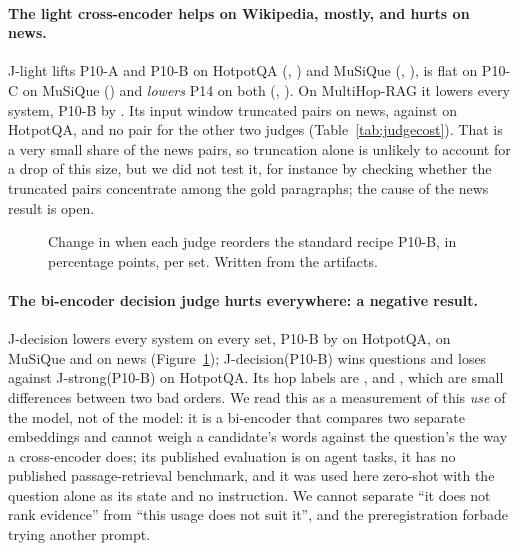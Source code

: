 \paragraph{The light cross-encoder helps on Wikipedia, mostly, and hurts on news.} J-light
lifts P10-A and P10-B on HotpotQA (\deltaLightPTenAHotpot\pp, \deltaLightPTenBHotpot\pp) and MuSiQue
(\deltaLightPTenAMusique\pp, \deltaLightPTenBMusique\pp), is flat on P10-C on MuSiQue
(\deltaLightPTenCMusique\pp) and \emph{lowers} P14 on both (\deltaLightPFourteenHotpot\pp,
\deltaLightPFourteenMusique\pp). On MultiHop-RAG it lowers every system, P10-B by
\deltaLightPTenBMultihop\pp. Its input window truncated \truncCountLightMultihop{} pairs on news, against
\truncCountLightHotpot{} on HotpotQA, and no pair for the other two judges (Table~\ref{tab:judgecost}).
That is a very small share of the news pairs, so truncation alone is unlikely to account for a drop of this
size, but we did not test it, for instance by checking whether the truncated pairs concentrate among the gold
paragraphs; the cause of the news result is open.

\begin{figure}[t]
\centering

\caption{Change in \FS{} when each judge reorders the standard recipe P10-B, in percentage
points, per set. Written from the artifacts.}
\label{fig:delta}
\end{figure}

\paragraph{The bi-encoder decision judge hurts everywhere: a negative result.} J-decision
lowers every system on every set, P10-B by \deltaDecisionPTenBHotpot\pp{} on HotpotQA,
\deltaDecisionPTenBMusique\pp{} on MuSiQue and \deltaDecisionPTenBMultihop\pp{} on news
(Figure~\ref{fig:delta}); J-decision(P10-B) wins \winsCrossDecisionVsStrongHotpot{} questions and loses
\lossesCrossDecisionVsStrongHotpot{} against J-strong(P10-B) on HotpotQA. Its hop labels are
\texttt{}, \texttt{} and \texttt{},
which are small differences between two bad orders. We read this as a measurement of this
\emph{use} of the model, not of the model: it is a bi-encoder that compares two separate
embeddings and cannot weigh a candidate's words against the question's the way a cross-encoder
does; its published evaluation is on agent tasks, it has no published passage-retrieval benchmark, and it was
used here zero-shot with the question alone as its state and no instruction. We cannot separate
``it does not rank evidence'' from ``this usage does not suit it'', and the preregistration forbade
trying another prompt.

